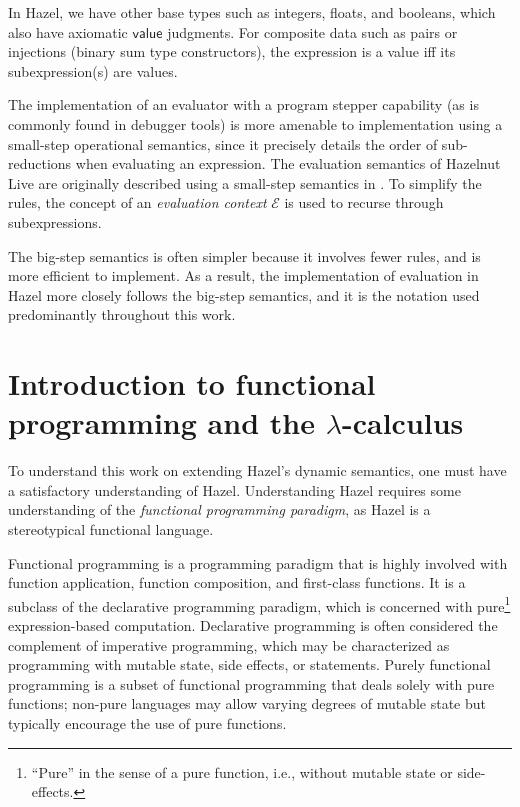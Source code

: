 In Hazel, we have other base types such as integers, floats, and booleans, which also have axiomatic $\textsf{value}$ judgments. For composite data such as pairs or injections (binary sum type constructors), the expression is a value iff its subexpression(s) are values.

The implementation of an evaluator with a program stepper capability (as is commonly found in debugger tools) is more amenable to implementation using a small-step operational semantics, since it precisely details the order of sub-reductions when evaluating an expression. The evaluation semantics of Hazelnut Live are originally described using a small-step semantics in \cite{conf/popl/HazelnutLive19}. To simplify the rules, the concept of an \textit{evaluation context} $\mathcal{E}$ is used to recurse through subexpressions.

The big-step semantics is often simpler because it involves fewer rules, and is more efficient to implement. As a result, the implementation of evaluation in Hazel more closely follows the big-step semantics, and it is the notation used predominantly throughout this work.

\section{Introduction to functional programming and the $\lambda$-calculus}
\label{sec:fp-lc}

To understand this work on extending Hazel's dynamic semantics, one must have a satisfactory understanding of Hazel. Understanding Hazel requires some understanding of the \textit{functional programming paradigm}, as Hazel is a stereotypical functional language. 

Functional programming \cite{hughes1989functional} is a programming paradigm that is highly involved with function application, function composition, and first-class functions. It is a subclass of the declarative programming paradigm, which is concerned with pure\footnote{``Pure'' in the sense of a pure function, i.e., without mutable state or side-effects.} expression-based computation. Declarative programming is often considered the complement of imperative programming, which may be characterized as programming with mutable state, side effects, or statements. Purely functional programming is a subset of functional programming that deals solely with pure functions; non-pure languages may allow varying degrees of mutable state but typically encourage the use of pure functions.

